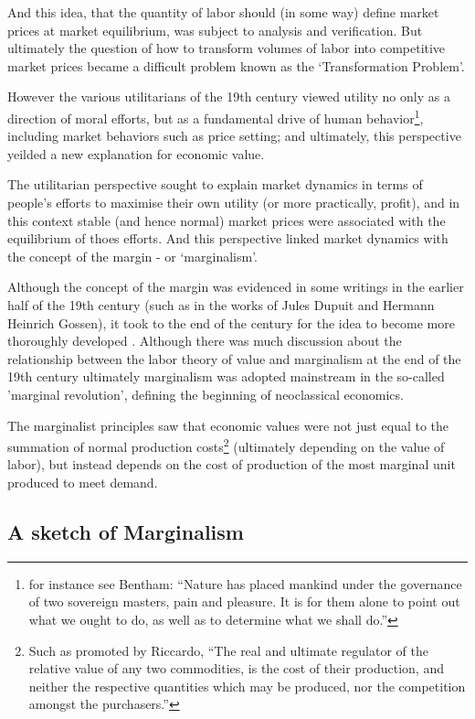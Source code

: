 And this idea, that the quantity of labor should (in some way) define market prices at market equilibrium, was subject to analysis and verification.
But ultimately the question of how to transform volumes of labor into competitive market prices became a difficult problem known as the `Transformation Problem'.

However the various utilitarians of the 19th century viewed utility no only as a direction of moral efforts, but as a fundamental drive of human behavior\footnote{for instance see Bentham: ``Nature has placed mankind under the governance of two sovereign masters, pain and pleasure.
It is for them alone to point out what we ought to do, as well as to determine what we shall do.''\cite{bentham1823introduction}}, including market behaviors such as price setting; and ultimately, this perspective yeilded a new explanation for economic value.

The utilitarian perspective sought to explain market dynamics in terms of people's efforts to maximise their own utility (or more practically, profit), and in this context stable (and hence normal) market prices were associated with the equilibrium of thoes efforts.
And this perspective linked market dynamics with the concept of the margin - or `marginalism'.

Although the concept of the margin was evidenced in some writings in the earlier half of the 19th century (such as in the works of Jules Dupuit and Hermann Heinrich Gossen), it took to the end of the century for the idea to become more thoroughly developed \cite{RePEc:ucp:jpolec:v:58:y:1950:p:307}.
Although there was much discussion about the relationship between the labor theory of value and marginalism at the end of the 19th century \cite{steedman2003socialism} ultimately marginalism was adopted mainstream in the so-called 'marginal revolution', defining the beginning of neoclassical economics.\cite{marginalism1}

The marginalist principles saw that economic values were not just equal to the summation of normal production costs\footnote{Such as promoted by Riccardo, ``The real and ultimate regulator of the relative value of any two commodities, is the cost of their production, and neither the respective quantities which may be produced, nor the competition amongst the purchasers.''\cite{Riccardo1Gutenberg}} (ultimately depending on the value of labor), but instead depends on the cost of production of the most marginal unit produced to meet demand.

\subsection{A sketch of Marginalism}\label{subsec:marginal_price_sketch}

